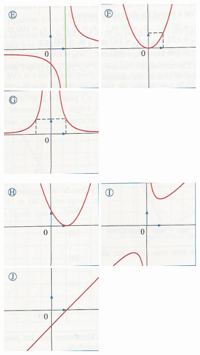 \documentclass[12pt, twoside]{article}
\begin{document}
\bigskip

\bigskip

\includegraphics[width=5cm]{images/E.png} \qquad \quad \quad
\includegraphics[width=5cm]{images/F.png} \qquad \quad \quad
\includegraphics[width=5cm]{images/G.png}

\bigskip

\bigskip

\includegraphics[width=5cm]{images/H.png} \qquad \qquad \quad
\includegraphics[width=5cm]{images/I.png} \qquad \qquad \quad
\includegraphics[width=5cm]{images/J.png} 
\end{document}
